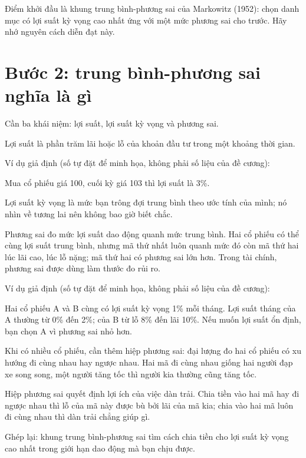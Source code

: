 Điểm khởi đầu là khung trung bình-phương sai của Markowitz (1952): chọn danh mục có lợi suất kỳ vọng cao nhất ứng với một mức phương sai cho trước. Hãy nhớ nguyên cách diễn đạt này.

\section{Bước 2: trung bình-phương sai nghĩa là gì}

Cần ba khái niệm: lợi suất, lợi suất kỳ vọng và phương sai.

Lợi suất là phần trăm lãi hoặc lỗ của khoản đầu tư trong một khoảng thời gian.

\begin{tcolorbox}[breakable]
Ví dụ giả định (số tự đặt để minh họa, không phải số liệu của đề cương):

Mua cổ phiếu giá 100, cuối kỳ giá 103 thì lợi suất là 3\%.
\end{tcolorbox}

Lợi suất kỳ vọng là mức bạn trông đợi trung bình theo ước tính của mình; nó nhìn về tương lai nên không bao giờ biết chắc.

Phương sai đo mức lợi suất dao động quanh mức trung bình. Hai cổ phiếu có thể cùng lợi suất trung bình, nhưng mã thứ nhất luôn quanh mức đó còn mã thứ hai lúc lãi cao, lúc lỗ nặng; mã thứ hai có phương sai lớn hơn. Trong tài chính, phương sai được dùng làm thước đo rủi ro.

\begin{tcolorbox}[breakable]
Ví dụ giả định (số tự đặt để minh họa, không phải số liệu của đề cương):

Hai cổ phiếu A và B cùng có lợi suất kỳ vọng 1\% mỗi tháng. Lợi suất tháng của A thường từ 0\% đến 2\%; của B từ lỗ 8\% đến lãi 10\%. Nếu muốn lợi suất ổn định, bạn chọn A vì phương sai nhỏ hơn.
\end{tcolorbox}

Khi có nhiều cổ phiếu, cần thêm hiệp phương sai: đại lượng đo hai cổ phiếu có xu hướng đi cùng nhau hay ngược nhau. Hai mã đi cùng nhau giống hai người đạp xe song song, một người tăng tốc thì người kia thường cũng tăng tốc.

Hiệp phương sai quyết định lợi ích của việc dàn trải. Chia tiền vào hai mã hay đi ngược nhau thì lỗ của mã này được bù bởi lãi của mã kia; chia vào hai mã luôn đi cùng nhau thì dàn trải chẳng giúp gì.

Ghép lại: khung trung bình-phương sai tìm cách chia tiền cho lợi suất kỳ vọng cao nhất trong giới hạn dao động mà bạn chịu được.

